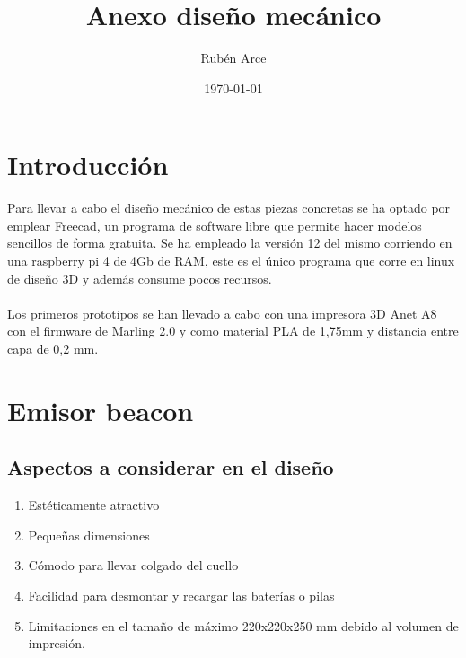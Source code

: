 \documentclass[a4paper ,12pt, onecolumn]{article}
\begin{document}
\title{Anexo diseño mecánico}

\author{Rubén Arce}
\date{\today}
\maketitle
\cleardoublepage
\tableofcontents
\listoffigures
\cleardoublepage

\section{Introducción}
Para llevar a cabo el diseño mecánico de estas piezas concretas se ha optado por emplear Freecad, un
programa de software libre que permite hacer modelos sencillos de forma gratuita.
Se ha empleado la versión 12 del mismo corriendo en una raspberry pi 4 de 4Gb de RAM, este es el único
programa que corre en linux de diseño 3D y además consume pocos recursos.
\paragraph{}
Los primeros prototipos se han llevado a cabo con una impresora 3D Anet A8 con el firmware de Marling
2.0 y como material PLA de 1,75mm y distancia entre capa de 0,2 mm.
\section{Emisor beacon}
    \subsection{Aspectos a considerar en el diseño}
        \begin{enumerate}
            \item Estéticamente atractivo
            \item Pequeñas dimensiones
            \item Cómodo para llevar colgado del cuello
            \item Facilidad para desmontar y recargar las baterías o pilas
            \item Limitaciones en el tamaño de máximo 220x220x250 mm debido al volumen de impresión.
        \end{enumerate}
\end{document}
